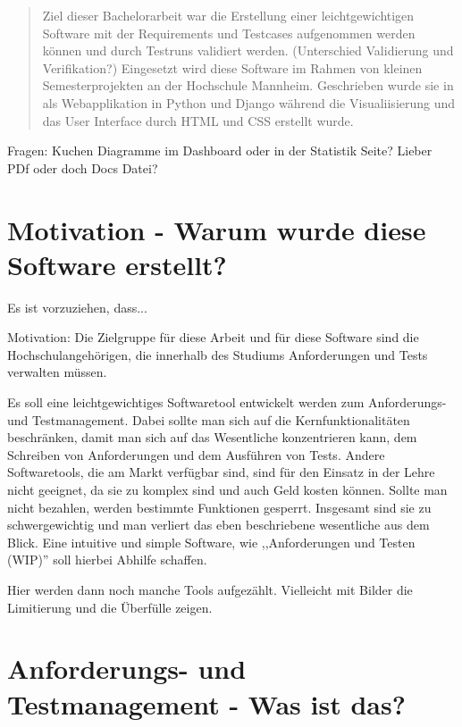 \documentclass[11pt,a4paper]{report}
\begin{document}

\begin{abstract} 
Ziel dieser Bachelorarbeit war die Erstellung einer leichtgewichtigen Software mit der Requirements und Testcases aufgenommen werden können und durch Testruns validiert werden. (Unterschied Validierung und Verifikation?) Eingesetzt wird diese Software im Rahmen von kleinen Semesterprojekten an der Hochschule Mannheim. Geschrieben wurde sie in als Webapplikation in Python und Django während die Visualiisierung und das User Interface durch HTML und CSS erstellt wurde.
\end{abstract}

\tableofcontents %

Fragen: 
Kuchen Diagramme im Dashboard oder in der Statistik Seite?
Lieber PDf oder doch Docs Datei?


\chapter{Motivation - Warum wurde diese Software erstellt?} \label{chap:motivation}
Es ist vorzuziehen, dass...

Motivation:
Die Zielgruppe für diese Arbeit und für diese Software sind die Hochschulangehörigen, die innerhalb des Studiums Anforderungen und Tests verwalten müssen. 

Es soll eine leichtgewichtiges Softwaretool entwickelt werden zum Anforderungs- und Testmanagement. Dabei sollte man sich auf die Kernfunktionalitäten beschränken, damit man sich auf das Wesentliche konzentrieren kann, dem Schreiben von Anforderungen und dem Ausführen von Tests. Andere Softwaretools, die am Markt verfügbar sind, sind für den Einsatz in der Lehre nicht geeignet, da sie zu komplex sind und auch Geld kosten können. Sollte man nicht bezahlen, werden bestimmte Funktionen gesperrt. Insgesamt sind sie zu schwergewichtig und man verliert das eben beschriebene wesentliche aus dem Blick. Eine intuitive und simple Software, wie ,,Anforderungen und Testen (WIP)'' soll hierbei Abhilfe schaffen.

Hier werden dann noch manche Tools aufgezählt. Vielleicht mit Bilder die Limitierung und die Überfülle zeigen.
\chapter{Anforderungs- und Testmanagement - Was ist das?} 
\label{chap:sw}
\end{document}

